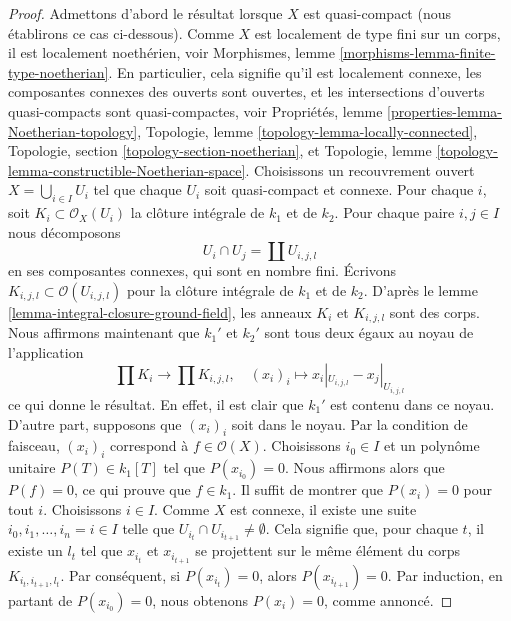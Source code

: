 \begin{proof}
 Admettons d'abord le résultat lorsque $X$ est quasi-compact (nous établirons
ce cas ci-dessous). Comme 
$X$ est localement de type fini sur un corps, il est localement noethérien,
voir Morphismes, lemme \ref{morphisms-lemma-finite-type-noetherian}.
En particulier, cela signifie qu'il est localement
connexe, les composantes connexes des ouverts sont
ouvertes, et les intersections d'ouverts quasi-compacts sont quasi-compactes,
voir Propriétés, lemme \ref{properties-lemma-Noetherian-topology},
Topologie, lemme \ref{topology-lemma-locally-connected},
Topologie, section \ref{topology-section-noetherian},
et Topologie, lemme \ref{topology-lemma-constructible-Noetherian-space}.
Choisissons un recouvrement ouvert $X = \bigcup_{i \in I} U_i$
 tel que chaque $U_i$ soit quasi-compact et connexe. Pour
chaque $i$, soit $K_i \subset \mathcal{O}_X(U_i)$ la clôture
intégrale de $k_1$ et de $k_2$.
Pour chaque paire $i, j \in I$ nous décomposons 
$$
U_i \cap U_j = \coprod U_{i, j, l}
$$
 en ses composantes connexes, qui sont en nombre fini. Écrivons 
$K_{i, j, l} \subset \mathcal{O}(U_{i, j, l})$
 pour la clôture intégrale de $k_1$ et de $k_2$. D'après
le lemme \ref{lemma-integral-closure-ground-field},
les anneaux $K_i$ et $K_{i, j, l}$ sont des corps.
Nous affirmons maintenant que $k_1'$ et $k_2'$ sont tous deux égaux au noyau de l'application 
$$
\prod K_i \longrightarrow \prod K_{i, j, l}, \quad
(x_i)_i \longmapsto x_i|_{U_{i, j, l}} - x_j|_{U_{i, j, l}}
$$
ce qui donne le résultat. En effet, il est clair que
$k_1'$ est contenu dans ce noyau. D'autre part, supposons que
$(x_i)_i$ soit dans le noyau. Par la condition de faisceau,
$(x_i)_i$ correspond à $f \in \mathcal{O}(X)$.
Choisissons $i_0 \in I$ et un polynôme unitaire $P(T) \in k_1[T]$
tel que $P(x_{i_0}) = 0$. Nous affirmons alors que $P(f) =
0$, ce qui prouve que $f \in k_1$. Il suffit de
montrer que $P(x_i) = 0$ pour tout $i$. Choisissons $i \in I$.
Comme $X$ est connexe, il existe une suite $i_0, i_1, \ldots, i_n =
i \in I$ telle que $U_{i_t} \cap U_{i_{t + 1}} \not = \emptyset$.
Cela signifie que, pour chaque $t$, il existe un $l_t$
tel que $x_{i_t}$ et $x_{i_{t + 1}}$ se projettent sur le même
élément du corps $K_{i_t, i_{t + 1}, l_t}$. Par conséquent, si
$P(x_{i_t}) = 0$, alors $P(x_{i_{t + 1}}) = 0$. Par induction, en
partant de $P(x_{i_0}) = 0$, nous obtenons $P(x_i) = 0$, comme annoncé.


\end{proof}
